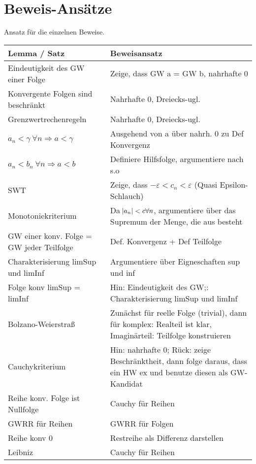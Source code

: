 \documentclass[10pt]{article}
\begin{document}
    \section{Beweis-Ansätze}
    Ansatz für die einzelnen Beweise.
    \begin{center}
        \begin{tabular}{lp{5cm}}
            \toprule
                Lemma / Satz & Beweisansatz\\
            \midrule
                Eindeutigkeit des GW einer Folge & Zeige, dass GW a = GW b, nahrhafte 0\\
                Konvergente Folgen sind beschränkt & Nahrhafte 0, Dreiecks-ugl.\\
                Grenzwertrechenregeln & Nahrhafte 0, Dreiecks-ugl. \\
                $a_n < \gamma\ \forall n \Rightarrow a < \gamma$  & Ausgehend von a über nahrh. 0 zu Def Konvergenz \\
                $a_n < b_n\ \forall n \Rightarrow a<b$ & Definiere Hilfsfolge, argumentiere nach s.o \\
                SWT & Zeige, dass $-\varepsilon < c_n < \varepsilon$  (Quasi Epsilon-Schlauch) \\
                Monotoniekriterium & Da $\abs{a_n} < c \forall n$, argumentiere über das Supremum der Menge, die aus  besteht \\
                GW einer konv. Folge = GW jeder Teilfolge & Def. Konvergenz + Def Teilfolge \\
                Charakterisierung limSup und limInf & Argumentiere über Eigneschaften sup und inf \\
                Folge konv limSup = limInf & Hin: Eindeutigkeit des GW;: Charakterisierung limSup und limInf \\
                Bolzano-Weierstraß & Zunächst für reelle Folge (trivial), dann für komplex: Realteil ist klar, Imaginärteil: Teilfolge konstruieren \\
                Cauchykriterium & Hin: nahrhafte 0; Rück: zeige Beschränktheit, dann folge daraus, dass ein HW ex und benutze diesen als GW-Kandidat \\
                Reihe konv.  Folge ist Nullfolge & Cauchy für Reihen \\
                GWRR für Reihen & GWRR für Folgen \\
                Reihe konv  0 & Restreihe als Differenz darstellen \\
                Leibniz & Cauchy für Reihen \\

\end{tabular}
\end{center}
\end{document}
